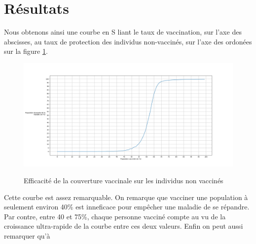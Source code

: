 \documentclass[journal, a4paper]{IEEEtran}
\begin{document}
\section{Résultats}
	Nous obtenons ainsi une courbe en S liant le taux de vaccination, sur l'axe des abscisses, au taux de protection des individus non-vaccinés, sur l'axe des ordonées sur la figure \ref{fig:results}.
	\begin{figure}
	\caption{Efficacité de la couverture vaccinale sur les individus non vaccinés}
		\includegraphics[scale=0.2]{Results}
		\label{fig:results}
	\end{figure}
	Cette courbe est assez remarquable. On remarque que vacciner une population à seulement environ 40\% est inneficace pour empêcher une maladie de se répandre. Par contre, entre 40 et 75\%, chaque personne vacciné compte au vu de la croissance ultra-rapide de la courbe entre ces deux valeurs. Enfin on peut aussi remarquer qu'à
\end{document}
